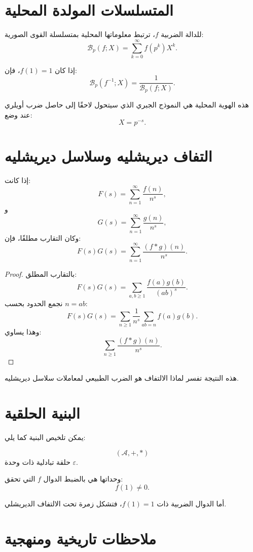 \section{المتسلسلات المولدة المحلية}

للدالة الضربية \(f\)، ترتبط معلوماتها المحلية بمتسلسلة القوى الصورية:
\[
\mathcal{B}_p(f;X)
=
\sum_{k=0}^{\infty}f(p^k)X^k.
\]

إذا كان \(f(1)=1\)، فإن:
\[
\mathcal{B}_p(f^{-1};X)
=
\frac1{\mathcal{B}_p(f;X)}.
\]

هذه الهوية المحلية هي النموذج الجبري الذي سيتحول لاحقًا إلى حاصل ضرب أويلري عند وضع:
\[
X=p^{-s}.
\]

\section{التفاف ديريشليه وسلاسل ديريشليه}

\begin{theorem}
\label{thm:dirichlet-convolution-series-product}
\provedhere
إذا كانت:
\[
F(s)=\sum_{n=1}^{\infty}\frac{f(n)}{n^s},
\]
و
\[
G(s)=\sum_{n=1}^{\infty}\frac{g(n)}{n^s},
\]
وكان التقارب مطلقًا، فإن:
\[
F(s)G(s)
=
\sum_{n=1}^{\infty}\frac{(f*g)(n)}{n^s}.
\]
\end{theorem}

\begin{proof}
بالتقارب المطلق:
\[
F(s)G(s)
=
\sum_{a,b\geq1}
\frac{f(a)g(b)}{(ab)^s}.
\]
نجمع الحدود بحسب \(n=ab\):
\[
F(s)G(s)
=
\sum_{n\geq1}
\frac1{n^s}
\sum_{ab=n}f(a)g(b).
\]
وهذا يساوي:
\[
\sum_{n\geq1}\frac{(f*g)(n)}{n^s}.
\]
\end{proof}

هذه النتيجة تفسر لماذا الالتفاف هو الضرب الطبيعي لمعاملات سلاسل ديريشليه.

\section{البنية الحلقية}

يمكن تلخيص البنية كما يلي:

\[
(\mathcal{A},+,*)
\]
حلقة تبادلية ذات وحدة \(\varepsilon\).

وحداتها هي بالضبط الدوال \(f\) التي تحقق:
\[
f(1)\neq0.
\]

أما الدوال الضربية ذات \(f(1)=1\)، فتشكل زمرة تحت الالتفاف الديريشلي.

\section{ملاحظات تاريخية ومنهجية}

